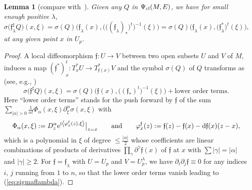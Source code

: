 \documentclass[pdftex]{sigma}
\numberwithin{equation}{section}
\newtheorem{lem}[thm]{Lemma}
\theoremstyle{definition}
\begin{document}
\begin{lem}[{compare with~\cite[p.~381]{Sc}}]
Given any $Q$ in $\Psi_{\rm cl}(M,E)$,
 we have for small enough positive $\lambda$, 	
\begin{equation}\label{eq:sigmaflambda}
\sigma\bigl( {\mathfrak f}_{ \lambda}^\sharp Q\bigr)(x,\xi)
= 	\sigma(Q)\bigl( 	{\mathfrak f}_{ \lambda}(x),\bigl( \bigl( ({\mathfrak f}_{ \lambda})_*\bigr)^t\bigr)^{-1} (\xi)\bigr)
=\sigma ({ Q})\bigl({ { {\mathfrak f}}_{ \lambda}(x)}, \bigl({\mathfrak f}_{ \lambda}^*\bigr)^t (\xi)\bigr),
\end{equation}
at any given point $x$ in $U_p$.
\end{lem}
\begin{proof} A local diffeomorphism $\mathfrak{f}\colon U\to V$ between two open subsets $U$ and $V$ of $M$, induces a map $ ({\mathfrak f}^*)^t_x\colon T_x^*U\to T_{\mathfrak{f}(x)}^*V$ and the symbol $\sigma(Q)$ of $Q$ transforms as (see, e.g., \cite[equation~(4.2.1)]{Sh})
\begin{equation}\label{eq:sigmafsharp}
\sigma\bigl({\mathfrak{f}}^\sharp Q\bigr)(x, \xi)= \sigma(Q)\bigl(\mathfrak{f}(x), \bigl( ({\mathfrak f}_{ *})^t\bigr)^{-1}(\xi)\bigr)+ \text{lower order terms}.
\end{equation}
Here ``lower order terms'' stands for the push forward by $\mathfrak{f}$ of the sum  $\sum_{\vert \alpha\vert >0}
\frac{1}{\alpha!} \Phi_\alpha(x, \xi)
\partial_\xi^\alpha \sigma\left(x, \xi \right) $ with
\[
\Phi_\alpha (x, \xi):=
 D_z^\alpha {\rm e}^{{\rm i}\left\langle \varphi_x^\mathfrak{f}(z), \xi\right\rangle }\big\vert_{z=x} \qquad {\rm and}\qquad \varphi_x^\mathfrak{f}(z):=\mathfrak{f}(z)-\mathfrak{f}(x)-{\rm d}\mathfrak{f}(x)(z-x),
 \]
 which is a polynomial in $\xi$ of degree
 $\leq \frac{\vert \alpha\vert}{2}$
 whose coefficients are linear combinations of products of derivatives
 $ \prod_\gamma \partial^\gamma {\mathfrak f}(x)$ of $\mathfrak{f}$ at $x$ with $\sum\vert \gamma\vert=\vert\alpha\vert$ and $\vert\gamma\vert\geq 2$.
 For {$\mathfrak{f}=\mathfrak f_\lambda$ with $U=U_p$ and $V=U_p^\lambda$}, we have $\partial_i\partial_j \mathfrak{f}\equiv 0$ for any indices $i$, $j$ running from $1$ to $n$, so that the lower order terms vanish leading to (\ref{eq:sigmaflambda}).
 \end{proof}
\end{document}
